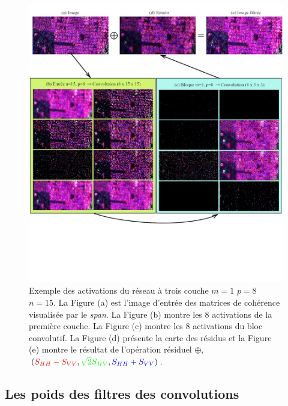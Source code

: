 \begin{figure}[!htbp] 
\includegraphics[width=1.1\textwidth]{figures/Chap4/results/analyse_model/activation/activation_viz.jpg}
 \centering
  \caption{
  \small{Exemple des activations du réseau à trois couche $m=1$ $p=8$ $n=15$. La Figure (a) est l'image d'entrée des matrices de cohérence visualisée par le \textit{span}. La Figure (b) montre les 8 activations de la première couche. La Figure (c) montre les 8 activations du bloc convolutif. La Figure (d) présente la carte des résidus et la Figure (e) montre le résultat de l'opération résiduel $\oplus$, $(\textcolor{red}{S_{HH}-S_{VV}}, \textcolor{green}{\sqrt{2}S_{HV}}, \textcolor{blue}{S_{HH}+S_{VV}})$.
  }}
  \label{fig:activation_viz}
\end{figure}

\subsection{Les poids des filtres des convolutions}

